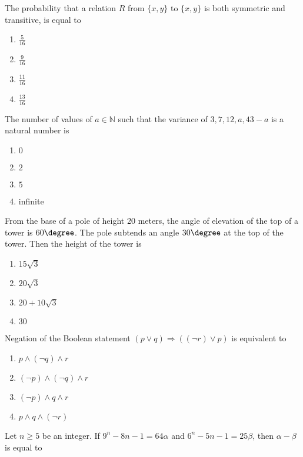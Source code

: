 \iffalse
\title{29-06-2022}
\author{EE24BTECH11004}
\section{mcq-single}
\fi
\item The probability that a relation $R$ from $\{x, y\}$ to $\{x, y\}$ is both symmetric and transitive, is equal to
\begin{enumerate}
    \item $\frac{5}{16}$
    \item $\frac{9}{16}$
    \item $\frac{11}{16}$
    \item $\frac{13}{16}$
\end{enumerate}
\item The number of values of $a \in \mathbb{N}$ such that the variance of $3, 7, 12, a, 43 - a$ is a natural number is
\begin{enumerate}
    \item $0$
    \item $2$
    \item $5$
    \item infinite
\end{enumerate}
\item From the base of a pole of height 20 meters, the angle of elevation of the top of a tower is $60\degree$. The pole subtends an angle $30\degree$ at the top of the tower. Then the height of the tower is
\begin{enumerate}
    \item $15\sqrt{3}$
    \item $20\sqrt{3}$
    \item $20 + 10\sqrt{3}$
    \item $30$
\end{enumerate}
\item Negation of the Boolean statement $(p \lor q) \Rightarrow ((\neg r) \lor p)$ is equivalent to
\begin{enumerate}
    \item $p \land (\neg q) \land r$
    \item $(\neg p) \land (\neg q) \land r$
    \item $(\neg p) \land q \land r$
    \item $p \land q \land (\neg r)$
\end{enumerate}
\item Let $n \geq 5$ be an integer. If $9^n - 8n - 1 = 64 \alpha$ and $6^n - 5n - 1 = 25 \beta$, then $\alpha - \beta$ is equal to
